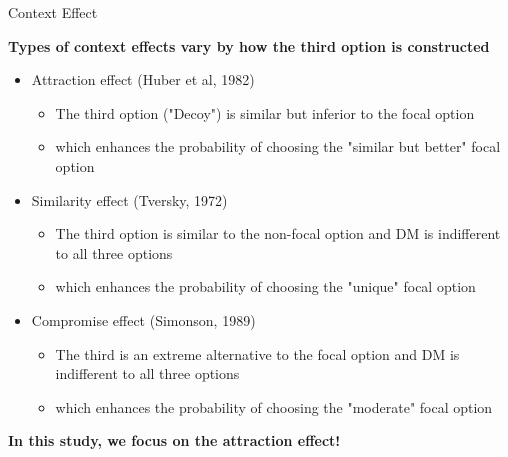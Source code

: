 \documentclass[
  ignorenonframetext,
  aspectratio=169]{beamer}
\begin{document}
\begin{frame}{Context Effect}
\label{context-effect-2}
\begin{center}
  \textbf{Types of context effects vary by how the third option is constructed}
\end{center}

\pause
\begin{itemize}
  \item Attraction effect (Huber et al, 1982)
  \begin{itemize}
    \item The third option ("Decoy") is similar but inferior to the focal option 
    \item which enhances the probability of choosing the "similar but better" focal option
  \end{itemize}
  \pause
  \item Similarity effect (Tversky, 1972)
  \begin{itemize}
    \item The third option is similar to the non-focal option and DM is indifferent to all three options
    \item which enhances the probability of choosing the "unique" focal option
  \end{itemize}
  \pause
  \item Compromise effect (Simonson, 1989)
  \begin{itemize}
    \item The third is an extreme alternative to the focal option and DM is indifferent to all three options
    \item which enhances the probability of choosing the "moderate" focal option
  \end{itemize}
\end{itemize}

\vfill

\begin{center}
\pause
  \textbf{In this study, we focus on the attraction effect!}
\end{center}
\end{frame}
\end{document}
